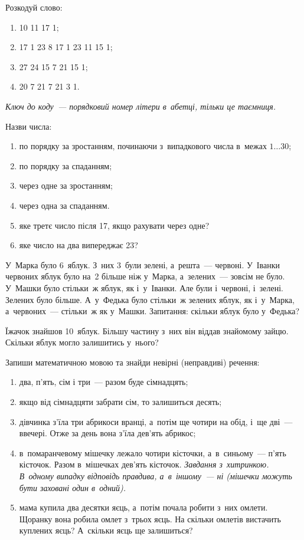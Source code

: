 \problem
Розкодуй слово:
\begin{enumerate}
    \item 10 11 17 1; 
    \item 17 1 23 8 17 1 23 11 15 1;
    \item 27 24 15 7 21 15 1;
    \item 20 7 21 7 21 3 1.
\end{enumerate}

\emph{
Ключ до коду~--- порядковий номер літери в~абетці, тільки це таємниця.
}


\problem
Назви числа:
\begin{enumerate}
    \item по порядку за зростанням, починаючи з~випадкового числа
    в~межах $1\ldots30$;
    \item по порядку за спаданням;
    \item через одне за зростанням;
    \item через одна за спаданням.
    \item яке третє число після 17, якщо рахувати через одне?
    \item яке число на два випереджає 23?
\end{enumerate}


\problem
У~Марка було 6~яблук. З~них 3~були зелені, а~решта~--- червоні.
У~Іванки червоних яблук було на~2 більше ніж у~Марка,
а~зелених~--- зовсім не було.
У~Машки було стільки~ж яблук, як і~у~Іванки.
Але були і~червоні, і~зелені. Зелених було більше.
А~у~Федька було стільки~ж зелених яблук, як і~у~Марка,
а~червоних~--- стільки~ж як у~Машки.
Запитання: скільки яблук було у~Федька?


\problem
Їжачок знайшов 10~яблук.
Більшу частину з~них він віддав знайомому зайцю.
Скільки яблук могло залишитись у~нього?


\problem
Запиши математичною мовою та знайди невірні (неправдиві) речення:
\begin{enumerate}
    \item два, п'ять, сім і три~--- разом буде сімнадцять;
    \item якщо від сімнадцяти забрати сім, то залишиться десять;
    \item дівчинка з'їла три абрикоси вранці, а~потім ще чотири на обід,
    і~ще дві~--- ввечері. Отже за день вона з'їла дев'ять абрикос;
    \item в~помаранчевому мішечку лежало чотири кісточки,
    а~в~синьому~--- п'ять кісточок. Разом в~мішечках дев'ять кісточок.
    \emph{Завдання з~хитринкою. В~одному випадку відповідь правдива,
    а~в~іншому~--- ні (мішечки можуть бути заховані один в~одний).}
    \item мама купила два десятки яєць, а~потім почала робити з~них омлети.
    Щоранку вона робила омлет з~трьох яєць.
    На скільки омлетів вистачить куплених яєць? А~скільки яєць ще залишиться?
\end{enumerate}


